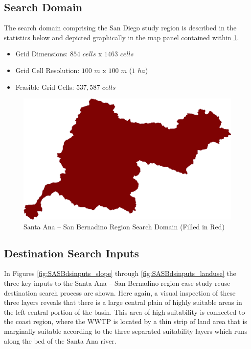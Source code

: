     \subsection{Search Domain}

    The search domain comprising the San Diego study region is described in the statistics below and depicted graphically in the map panel contained within \ref{fig:SASBdomain}.
    
    \begin{itemize}
      \setlength{\itemsep}{0cm}
      \setlength{\parskip}{0cm}
        \item Grid Dimensions: $854$ $cells$ x $1463$ $cells$
        \item Grid Cell Resolution: $100$ $m$ x $100$ $m$ ($1$ $ha$)
        \item Feasible Grid Cells: $537,587$ $cells$
    \end{itemize}
    
        \begin{figure}[!h]
            \begin{center}
            \includegraphics[width=5.5in]{figures/SanBernadino_SearchDomain.png}   
            \caption{Santa Ana -- San Bernadino Region Search Domain (Filled in Red)}
            \label{fig:SASBdomain}
            \end{center}
        \end{figure}
        
\subsection{Destination Search Inputs}

In Figures \ref{fig:SASBdsinputs_slope} through \ref{fig:SASBdsinputs_landuse} the three key inputs to the Santa Ana -- San Bernadino region case study reuse destination search process are shown. Here again, a visual inspection of these three layers reveals that there is a large central plain of highly suitable areas in the left central portion of the basin. This area of high suitability is connected to the coast region, where the WWTP is located by a thin strip of land area that is marginally suitable according to the three separated suitability layers which runs along the bed of the Santa Ana river. 
    
